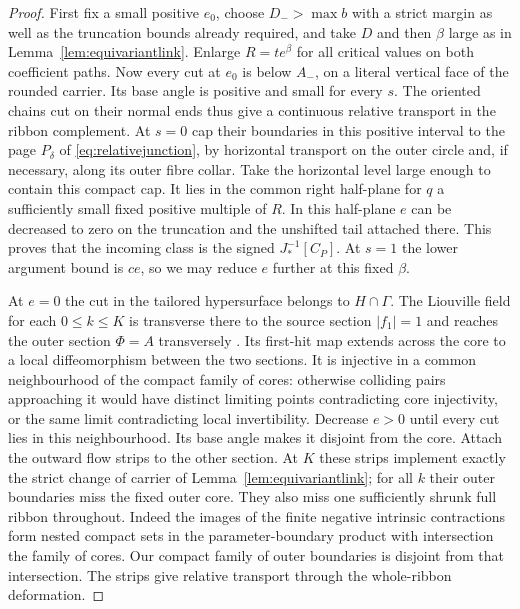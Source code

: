 \begin{proof}
First fix a small positive $e_0$, choose $D_->\max b$ with a strict margin as well as the truncation bounds already required, and take $D$ and then $\beta$ large as in Lemma~\ref{lem:equivariantlink}. Enlarge $R=t e^\beta$ for all critical values on both coefficient paths. Now every cut at $e_0$ is below $A_-$, on a literal vertical face of the rounded carrier. Its base angle is positive and small for every $s$. The oriented chains cut on their normal ends thus give a continuous relative transport in the ribbon complement. At $s=0$ cap their boundaries in this positive interval to the page $P_\delta$ of \eqref{eq:relativejunction}, by horizontal transport on the outer circle and, if necessary, along its outer fibre collar. Take the horizontal level large enough to contain this compact cap. It lies in the common right half-plane for $q$ a sufficiently small fixed positive multiple of $R$. In this half-plane $e$ can be decreased to zero on the truncation and the unshifted tail attached there. This proves that the incoming class is the signed $J_*^{-1}[C_P]$. At $s=1$ the lower argument bound is $ce$, so we may reduce $e$ further at this fixed $\beta$.

At $e=0$ the cut in the tailored hypersurface belongs to $H\cap\Gamma$. The Liouville field for each $0\le k\le K$ is transverse there to the source section $|f_1|=1$ and reaches the outer section $\Phi=A$ transversely \cite[U.6--U.9, U.26 and U.31]{FHSZ}. Its first-hit map extends across the core to a local diffeomorphism between the two sections. It is injective in a common neighbourhood of the compact family of cores: otherwise colliding pairs approaching it would have distinct limiting points contradicting core injectivity, or the same limit contradicting local invertibility. Decrease $e>0$ until every cut lies in this neighbourhood. Its base angle makes it disjoint from the core. Attach the outward flow strips to the other section. At $K$ these strips implement exactly the strict change of carrier of Lemma~\ref{lem:equivariantlink}; for all $k$ their outer boundaries miss the fixed outer core. They also miss one sufficiently shrunk full ribbon throughout. Indeed the images of the finite negative intrinsic contractions form nested compact sets in the parameter-boundary product with intersection the family of cores. Our compact family of outer boundaries is disjoint from that intersection. The strips give relative transport through the whole-ribbon deformation.


\end{proof}
